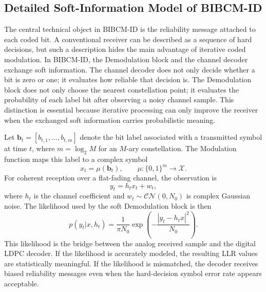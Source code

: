 \subsection{Detailed Soft-Information Model of BIBCM-ID}
The central technical object in BIBCM-ID is the reliability message attached to each coded bit. A conventional receiver can be described as a sequence of hard decisions, but such a description hides the main advantage of iterative coded modulation. In BIBCM-ID, the Demodulation block and the channel decoder exchange soft information. The channel decoder does not only decide whether a bit is zero or one; it evaluates how reliable that decision is. The Demodulation block does not only choose the nearest constellation point; it evaluates the probability of each label bit after observing a noisy channel sample. This distinction is essential because iterative processing can only improve the receiver when the exchanged soft information carries probabilistic meaning.

Let $\mathbf{b}_t=[b_{t,1},\ldots,b_{t,m}]$ denote the bit label associated with a transmitted symbol at time $t$, where $m=\log_2 M$ for an $M$-ary constellation. The Modulation function maps this label to a complex symbol
\begin{equation}
  x_t=\mu(\mathbf{b}_t), \qquad \mu:\{0,1\}^{m}\rightarrow\mathcal{X}.
\end{equation}
For coherent reception over a flat-fading channel, the observation is
\begin{equation}
  y_t=h_t x_t+w_t,
\end{equation}
where $h_t$ is the channel coefficient and $w_t\sim\mathcal{CN}(0,N_0)$ is complex Gaussian noise. The likelihood used by the soft Demodulation block is then
\begin{equation}
  p(y_t|x,h_t)=\frac{1}{\pi N_0}\exp\left(-\frac{|y_t-h_t x|^2}{N_0}\right).
\end{equation}
This likelihood is the bridge between the analog received sample and the digital LDPC decoder. If the likelihood is accurately modeled, the resulting LLR values are statistically meaningful. If the likelihood is mismatched, the decoder receives biased reliability messages even when the hard-decision symbol error rate appears acceptable.

